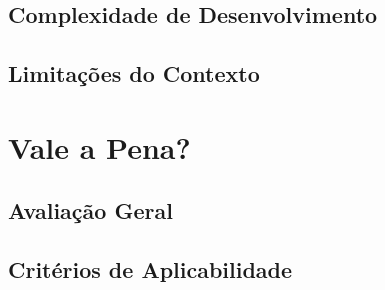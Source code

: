 \subsection{Complexidade de Desenvolvimento}


\subsection{Limitações do Contexto}


\section{Vale a Pena?}


\subsection{Avaliação Geral}


\subsection{Critérios de Aplicabilidade}


